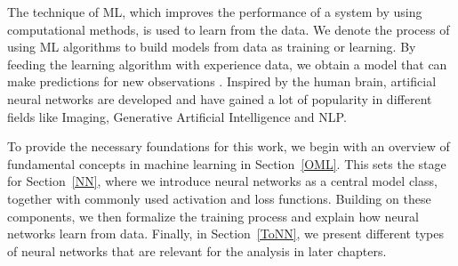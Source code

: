 The technique of \ac{ML}, which improves the performance of a system by using computational methods, is used to learn from the data. 
We denote the process of using \ac{ML} algorithms to build models from data as training or learning.
By feeding the learning algorithm with experience data, we obtain a model that can make predictions for new observations \cite{zhou_machine_2021}. 
Inspired by the human brain, artificial neural networks are developed and have gained a lot of popularity in different fields like Imaging, Generative Artificial Intelligence and \acf{NLP}.


To provide the necessary foundations for this work, we begin with an overview of fundamental concepts in machine learning in Section~\ref{OML}.
This sets the stage for Section~\ref{NN}, where we introduce neural networks as a central model class, together with commonly used activation and loss functions.
Building on these components, we then formalize the training process and explain how neural networks learn from data.
Finally, in Section~\ref{ToNN}, we present different types of neural networks that are relevant for the analysis in later chapters.

